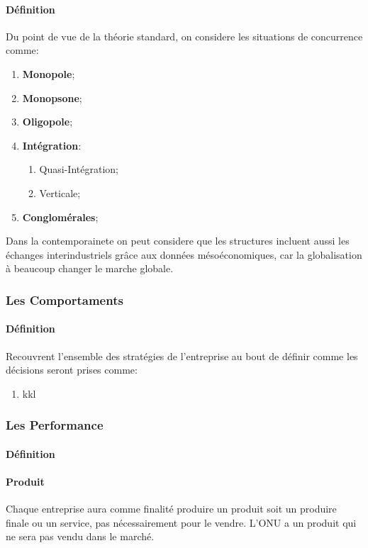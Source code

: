 \documentclass{article}
\begin{document}
\paragraph{Définition}Du point de vue de la théorie standard, on considere les situations de concurrence comme:
\begin{enumerate}
    \item \textbf{Monopole};

    \item \textbf{Monopsone};

    \item \textbf{Oligopole};

    \item \textbf{Intégration}:
    \begin{enumerate}[noitemsep]
        \item Quasi-Intégration;
        \item Verticale;
    \end{enumerate}

    \item \textbf{Conglomérales};
\end{enumerate}
Dans la contemporainete on peut considere que les structures incluent aussi les échanges interindustriels grâce aux données mésoéconomiques, car la globalisation à beaucoup changer le marche globale.

\subsubsection{Les Comportaments}
\paragraph{Définition}Recouvrent l'ensemble des stratégies de l'entreprise au bout de définir comme les décisions seront prises comme:
\begin{enumerate}
    \item kkl
\end{enumerate}

\subsubsection{Les Performance}
\paragraph{Définition}


\newpage
\paragraph{Produit}Chaque entreprise aura comme finalité produire un produit soit un produire finale ou un service, pas nécessairement pour le vendre. L'ONU a un produit qui ne sera pas vendu dans le marché.
\end{document}
